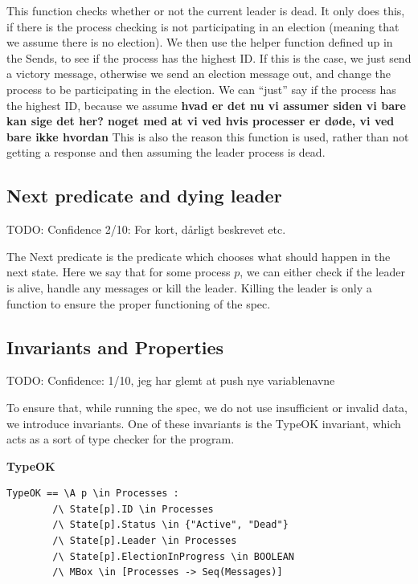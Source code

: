\documentclass{article}
\begin{document}
This function checks whether or not the current leader is dead. It only does this, if there is the process checking is not participating in an election (meaning that we assume there is no election). We then use the helper function defined up in the Sends, to see if the process has the highest ID. If this is the case, we just send a victory message, otherwise we send an election message out, and change the process to be participating in the election.
We can ``just'' say if the process has the highest ID, because we assume \textbf{hvad er det nu vi assumer siden vi bare kan sige det her? noget med at vi ved hvis processer er døde, vi ved bare ikke hvordan}
This is also the reason this function is used, rather than not getting a response and then assuming the leader process is dead.

\subsection{Next predicate and dying leader}
TODO: Confidence 2/10: For kort, dårligt beskrevet etc.

\noindent{}


The Next predicate is the predicate which chooses what should happen in the next state. Here we say that for some process $p$, we can either check if the leader is alive, handle any messages or kill the leader. Killing the leader is only a function to ensure the proper functioning of the spec.

\subsection{Invariants and Properties}
TODO: Confidence: 1/10, jeg har glemt at push nye variablenavne

To ensure that, while running the spec, we do not use insufficient or invalid data, we introduce invariants. One of these invariants is the TypeOK invariant, which acts as a sort of type checker for the program.

\textbf{TypeOK} \\
\begin{lstlisting}
TypeOK == \A p \in Processes :
        /\ State[p].ID \in Processes
        /\ State[p].Status \in {"Active", "Dead"}
        /\ State[p].Leader \in Processes
        /\ State[p].ElectionInProgress \in BOOLEAN
        /\ MBox \in [Processes -> Seq(Messages)]
\end{lstlisting}
\end{document}

